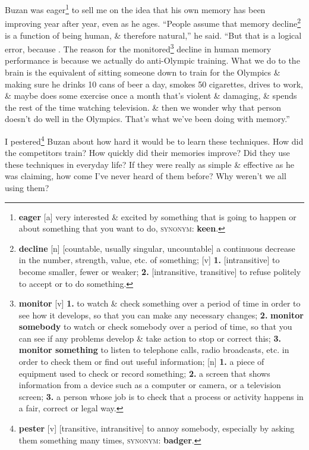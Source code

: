 \documentclass[oneside]{book}
\numberwithin{equation}{section}
\begin{document}
Buzan was eager\footnote{\textbf{eager} [a] very interested \& excited by something that is going to happen or about something that you want to do, \textsc{synonym}: \textbf{keen}.} to sell me on the idea that his own memory has been improving year after year, even as he ages. ``People assume that memory decline\footnote{\textbf{decline} [n] [countable, usually singular, uncountable] a continuous decrease in the number, strength, value, etc. of something; [v] \textbf{1.} [intransitive] to become smaller, fewer or weaker; \textbf{2.} [intransitive, transitive] to refuse politely to accept or to do something.} is a function of being human, \& therefore natural,'' he said. ``But that is a logical error, because . The reason for the monitored\footnote{\textbf{monitor} [v] \textbf{1.} to watch \& check something over a period of time in order to see how it develops, so that you can make any necessary changes; \textbf{2.} \textbf{monitor somebody} to watch or check somebody over a period of time, so that you can see if any problems develop \& take action to stop or correct this; \textbf{3.} \textbf{monitor something} to listen to telephone calls, radio broadcasts, etc. in order to check them or find out useful information; [n] \textbf{1.} a piece of equipment used to check or record something; \textbf{2.} a screen that shows information from a device such as a computer or camera, or a television screen; \textbf{3.} a person whose job is to check that a process or activity happens in a fair, correct or legal way.} decline in human memory performance is because we actually do anti-Olympic training. What we do to the brain is the equivalent of sitting someone down to train for the Olympics \& making sure he drinks 10 cans of beer a day, smokes 50 cigarettes, drives to work, \& maybe does some exercise once a month that's violent \& damaging, \& spends the rest of the time watching television. \& then we wonder why that person doesn't do well in the Olympics. That's what we've been doing with memory.''

I pestered\footnote{\textbf{pester} [v] [transitive, intransitive] to annoy somebody, especially by asking them something many times, \textsc{synonym}: \textbf{badger}.} Buzan about how hard it would be to learn these techniques. How did the competitors train? How quickly did their memories improve? Did they use these techniques in everyday life? If they were really as simple \& effective as he was claiming, how come I've never heard of them before? Why weren't we all using them?
\end{document}
